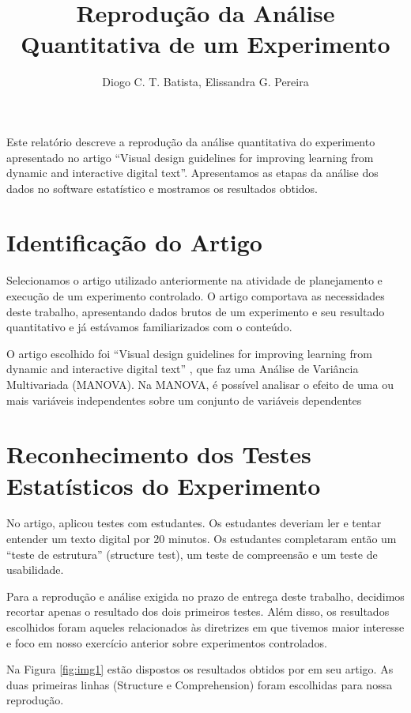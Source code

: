 \documentclass[12pt]{article}
\title{Reprodução da Análise Quantitativa de um Experimento}
\author{Diogo C. T. Batista\inst{1}, Elissandra G. Pereira\inst{1}}
\begin{document}
\maketitle

\begin{resumo}
Este relatório descreve a reprodução da análise quantitativa do experimento apresentado no artigo “Visual design guidelines for improving learning from dynamic and interactive digital text”. Apresentamos as etapas da análise dos dados no software estatístico e mostramos os resultados obtidos.
\end{resumo}

\section{Identificação do Artigo}

Selecionamos o artigo utilizado anteriormente na atividade de planejamento e execução de um experimento controlado. O artigo comportava as necessidades deste trabalho, apresentando dados brutos de um experimento e seu resultado quantitativo e já estávamos familiarizados com o conteúdo.

O artigo escolhido foi ``Visual design guidelines for improving learning from dynamic and interactive digital text'' \cite{JIN2013248}, que faz uma Análise de Variância Multivariada (MANOVA). Na MANOVA, é possível analisar o efeito de uma ou mais variáveis independentes sobre um conjunto de variáveis dependentes \cite{CHAGAS}

\section{Reconhecimento dos Testes Estatísticos do Experimento}

No artigo, \cite{JIN2013248} aplicou testes com estudantes. Os estudantes deveriam ler e tentar entender um texto digital por 20 minutos. Os estudantes completaram então um ``teste de estrutura'' (structure test), um teste de compreensão e um teste de usabilidade.

Para a reprodução e análise exigida no prazo de entrega deste trabalho, decidimos recortar apenas o resultado dos dois primeiros testes. Além disso, os resultados escolhidos foram aqueles relacionados às diretrizes em que tivemos maior interesse e foco em nosso exercício anterior sobre experimentos controlados.

Na Figura \ref{fig:img1} estão dispostos os resultados obtidos por \cite{JIN2013248} em seu artigo. As duas primeiras linhas (Structure e Comprehension) foram escolhidas para nossa reprodução.
\end{document}
